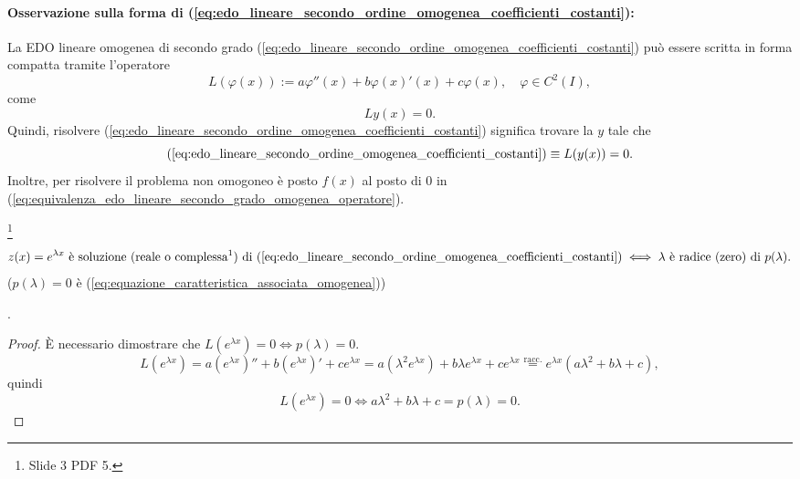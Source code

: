\paragraph{Osservazione sulla forma di (\ref{eq:edo_lineare_secondo_ordine_omogenea_coefficienti_costanti}):}
La EDO lineare omogenea di secondo grado (\ref{eq:edo_lineare_secondo_ordine_omogenea_coefficienti_costanti}) può essere scritta in forma compatta tramite l'operatore
\begin{equation*}
	L(\varphi(x)):=a\varphi''(x) + b\varphi(x)'(x) + c\varphi(x),\quad \varphi\in C^2(I),
\end{equation*}
come
\begin{equation*}
	Ly(x)=0.
\end{equation*}
Quindi, risolvere (\ref{eq:edo_lineare_secondo_ordine_omogenea_coefficienti_costanti}) significa trovare la $y$ tale che
\begin{equation}\label{eq:equivalenza_edo_lineare_secondo_grado_omogenea_operatore}
	(\ref{eq:edo_lineare_secondo_ordine_omogenea_coefficienti_costanti})\equiv L(y(x)) = 0.
\end{equation}
Inoltre, per risolvere il problema non omogoneo è posto $f(x)$ al posto di 0 in (\ref{eq:equivalenza_edo_lineare_secondo_grado_omogenea_operatore}).

\begin{proposition}\footnote{Slide 3 PDF 5.}\label{prop:e^lambdax_soluzione_omogenea_secondo_grado_lineare}
	\begin{equation*}
		z(x)=e^{\lambda x}\text{ è soluzione (reale o complessa\footnotemark) di (\ref{eq:edo_lineare_secondo_ordine_omogenea_coefficienti_costanti})} \iff \lambda \text{ è radice (zero) di } p(\lambda).
	\end{equation*}
	($p(\lambda)=0$ è (\ref{eq:equazione_caratteristica_associata_omogenea}))
\end{proposition}.
\begin{proof}
	È necessario dimostrare che $L(e^{\lambda x})=0\iff p(\lambda)=0$.
	\begin{equation*}
		L(e^{\lambda x}) = a(e^{\lambda x})''+ b(e^{\lambda x})'+ c e^{\lambda x} = a(\lambda^2 e^{\lambda x}) + b\lambda e^{\lambda x} + c e^{\lambda x} \overset{\text{racc.}}{=} e^{\lambda x} (a\lambda ^2 + b\lambda + c),
	\end{equation*}
	quindi
	\begin{equation*}
		L(e^{\lambda x}) = 0 \iff a\lambda^2 + b\lambda + c=p(\lambda) = 0.
	\end{equation*}
\end{proof}

